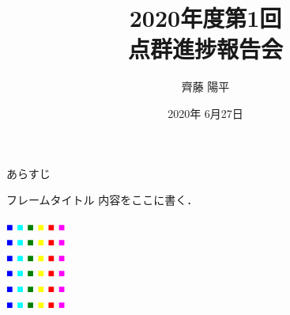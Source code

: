 \documentclass[dvipdfmx, a4p, cjk]{beamer}
\title{2020年度第1回 \\ 点群進捗報告会}
\author{齊藤 陽平}
\institute[田中研究室]{信州大学総合理工学研究科 田中エルナン宮川研究室}
\date{2020年 6月27日}
\newcommand{\red}[1]{\textcolor{red}{#1}}
\newcommand{\green}[1]{\textcolor{green}{#1}}
\newcommand{\blue}[1]{\textcolor{blue}{#1}}
\newcommand{\cyan}[1]{\textcolor{cyan}{#1}}
\newcommand{\magenta}[1]{\textcolor{magenta}{#1}}
\newcommand{\yellow}[1]{\textcolor{yellow}{#1}}
\begin{document}
\frame{\titlepage \thispagestyle{empty}}
\begin{frame}{あらすじ} \tableofcontents \end{frame}
\begin{frame}{フレームタイトル}
内容をここに書く．

\blue{■} \hspace{-9pt} \cyan{■} \hspace{-9pt} \green{■} \hspace{-9pt} \yellow{■} \hspace{-9pt} \red{■} \hspace{-9pt} \magenta{■} \vspace{-6pt}\\
\blue{■} \hspace{-9pt} \cyan{■} \hspace{-9pt} \green{■} \hspace{-9pt} \yellow{■} \hspace{-9pt} \red{■} \hspace{-9pt} \magenta{■} \vspace{-6pt}\\
\blue{■} \hspace{-9pt} \cyan{■} \hspace{-9pt} \green{■} \hspace{-9pt} \yellow{■} \hspace{-9pt} \red{■} \hspace{-9pt} \magenta{■} \vspace{-6pt}\\
\blue{■} \hspace{-9pt} \cyan{■} \hspace{-9pt} \green{■} \hspace{-9pt} \yellow{■} \hspace{-9pt} \red{■} \hspace{-9pt} \magenta{■} \vspace{-6pt}\\
\blue{■} \hspace{-9pt} \cyan{■} \hspace{-9pt} \green{■} \hspace{-9pt} \yellow{■} \hspace{-9pt} \red{■} \hspace{-9pt} \magenta{■} \vspace{-6pt}\\
\blue{■} \hspace{-9pt} \cyan{■} \hspace{-9pt} \green{■} \hspace{-9pt} \yellow{■} \hspace{-9pt} \red{■} \hspace{-9pt} \magenta{■} \vspace{-6pt}\\

\end{frame}
\end{document}
